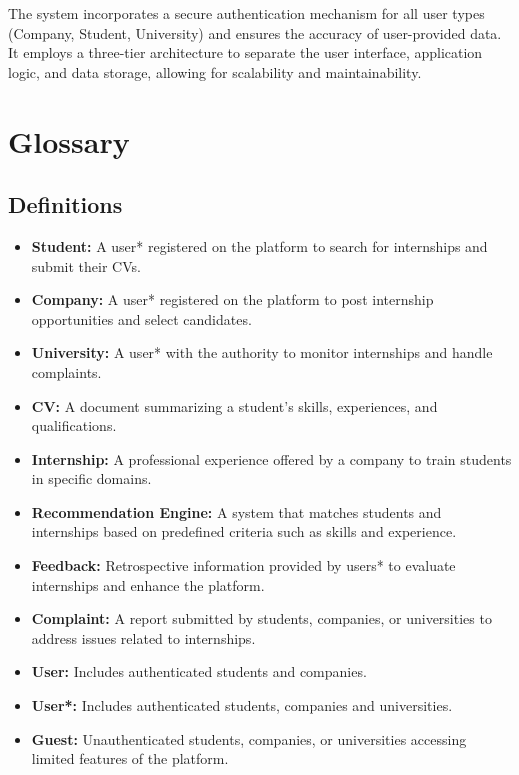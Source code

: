 The system incorporates a secure authentication mechanism for all user types (Company, Student, University)
and ensures the accuracy of user-provided data.
It employs a three-tier architecture to separate the user interface, application logic, and data storage,
allowing for scalability and maintainability.

\section{Glossary}\label{sec:glossary}

\subsection{Definitions}\label{subsec:definitions}
\begin{itemize}
    \item \textbf{Student:} A user* registered on the platform to search for internships and submit their CVs.
    \item \textbf{Company:} A user* registered on the platform to post internship opportunities and select candidates.
    \item \textbf{University:} A user* with the authority to monitor internships and handle complaints.
    \item \textbf{CV:} A document summarizing a student’s skills, experiences, and qualifications.
    \item \textbf{Internship:} A professional experience offered by a company to train students in specific domains.
    \item \textbf{Recommendation Engine:} A system that matches students and internships based on predefined criteria such as skills and experience.
    \item \textbf{Feedback:} Retrospective information provided by users* to evaluate internships and enhance the platform.
    \item \textbf{Complaint:} A report submitted by students, companies, or universities to address issues related to internships.
    \item \textbf{User:} Includes authenticated students and companies.
    \item \textbf{User*:} Includes authenticated students, companies and universities.
    \item \textbf{Guest:} Unauthenticated students, companies, or universities accessing limited features of the platform.
\end{itemize}

